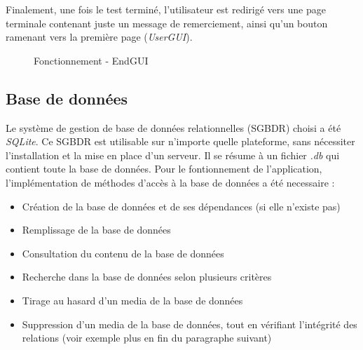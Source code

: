 Finalement, une fois le test terminé, l'utilisateur est redirigé vers une page terminale contenant juste un message de remerciement, ainsi qu'un bouton ramenant vers la première page (\textit{UserGUI}).

\begin{figure}[!ht]
\begin{center}
  \caption{Fonctionnement - EndGUI}
  \label{endGUI} 
\end{center}
\end{figure}

\subsection{Base de données}\label{BDD}

Le système de gestion de base de données relationnelles (SGBDR) choisi a été \textit{SQLite}. Ce SGBDR est utilisable sur n'importe quelle plateforme, sans nécessiter l'installation et la mise en place d'un serveur. Il se résume à un fichier \textit{.db} qui contient toute la base de données.
Pour le fontionnement de l'application, l'implémentation de méthodes d'accès à la base de données a été necessaire :


\begin{itemize}
 \item Création de la base de données et de ses dépendances (si elle n'existe pas)
 \item Remplissage de la base de données
 \item Consultation du contenu de la base de données
 \item Recherche dans la base de données selon plusieurs critères
 \item Tirage au hasard d'un media de la base de données
 \item Suppression d'un media de la base de données, tout en vérifiant l'intégrité des relations (voir exemple plus en fin du paragraphe suivant)
\end{itemize}


